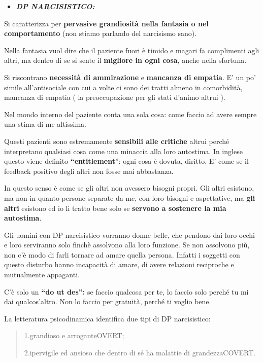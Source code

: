 \documentclass[]{article}
\begin{document}
\begin{itemize}
\item
  \textbf{\emph{DP NARCISISTICO:}}
\end{itemize}

Si caratterizza per \textbf{pervasive grandiosità nella fantasia o nel
comportamento} (non stiamo parlando del narcisismo sano).

Nella fantasia vuol dire che il paziente fuori è timido e magari fa
complimenti agli altri, ma dentro di se si sente il \textbf{migliore in
ogni cosa}, anche nella sfortuna.

Si riscontrano \textbf{necessità di ammirazione} e \textbf{mancanza di
empatia}. E' un po' simile all'antisociale con cui a volte ci sono dei
tratti almeno in comorbidità, mancanza di empatia ( la preoccupazione
per gli stati d'animo altrui ).

Nel mondo interno del paziente conta una sola cosa: come faccio ad avere
sempre una stima di me altissima.

Questi pazienti sono estremamente \textbf{sensibili alle critiche}
altrui perché interpretano qualsiasi cosa come una minaccia alla loro
autostima. In inglese questo viene definito \textbf{``entitlement}'':
ogni cosa è dovuta, diritto. E' come se il feedback positivo degli altri
non fosse mai abbastanza.

In questo senso è come se gli altri non avessero bisogni propri. Gli
altri esistono, ma non in quanto persone separate da me, con loro
bisogni e aspettative, ma \textbf{gli altri} esistono ed io li tratto
bene solo se \textbf{servono a sostenere la mia autostima}.

Gli uomini con DP narcisistico vorranno donne belle, che pendono dai
loro occhi e loro serviranno solo finchè assolvono alla loro funzione.
Se non assolvono più, non c'è modo di farli tornare ad amare quella
persona. Infatti i soggetti con questo disturbo hanno incapacità di
amare, di avere relazioni reciproche e mutualmente appaganti.

C'è solo un \textbf{``do ut des'':} se faccio qualcosa per te, lo faccio
solo perché tu mi dai qualcos'altro. Non lo faccio per gratuità, perché
ti voglio bene.

La letteratura psicodinamica identifica due tipi di DP narcisistico:

\begin{quote}
1.grandioso e arroganteOVERT;

2.ipervigile ed ansioso che dentro di sé ha malattie di grandezzaCOVERT.
\end{quote}
\end{document}
